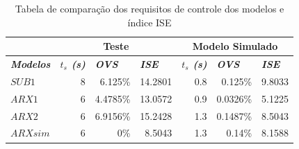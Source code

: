 \begin{table}[htb]
	\centering
	\begin{tabular}{l|r|r|r|r|r|r|}
		\cline{2-7}
		& \multicolumn{3}{c|}{\textbf{Teste}}                                                                                                        & \multicolumn{3}{c|}{\textbf{Modelo Simulado}}                                                                                              \\ \hline
		\multicolumn{1}{|l|}{\textit{\textbf{Modelos}}} & \multicolumn{1}{l|}{\textit{\textbf{$t_s$ (s)}}} & \multicolumn{1}{l|}{\textit{\textbf{OVS}}} & \multicolumn{1}{l|}{\textit{\textbf{ISE}}} & \multicolumn{1}{l|}{\textit{\textbf{$t_s$ (s)}}} & \multicolumn{1}{l|}{\textit{\textbf{OVS}}} & \multicolumn{1}{l|}{\textit{\textbf{ISE}}} \\ \hline
		\multicolumn{1}{|l|}{$SUB1$}                    & 8                                                & 6.125\%                                    & 14.2801                                    & 0.8                                              & 0.125\%                                    & 9.8033                                     \\ \hline
		\multicolumn{1}{|l|}{$ARX1$}                    & 6                                                & 4.4785\%                                   & 13.0572                                    & 0.9                                              & 0.0326\%                                   & 5.1225                                     \\ \hline
		\multicolumn{1}{|l|}{$ARX2$}                    & 6                                                & 6.9156\%                                   & 15.2428                                    & 1.3                                              & 0.1487\%                                   & 8.5043                                     \\ \hline
		\multicolumn{1}{|l|}{$ARXsim$}                  & 6                                                & 0\%                                        & 8.5043                                     & 1.3                                              & 0.14\%                                     & 8.1588                                     \\ \hline
	\end{tabular}
\caption{Tabela de comparação dos requisitos de controle dos modelos e índice ISE}
\label{tb:requisitosise}
\end{table}

